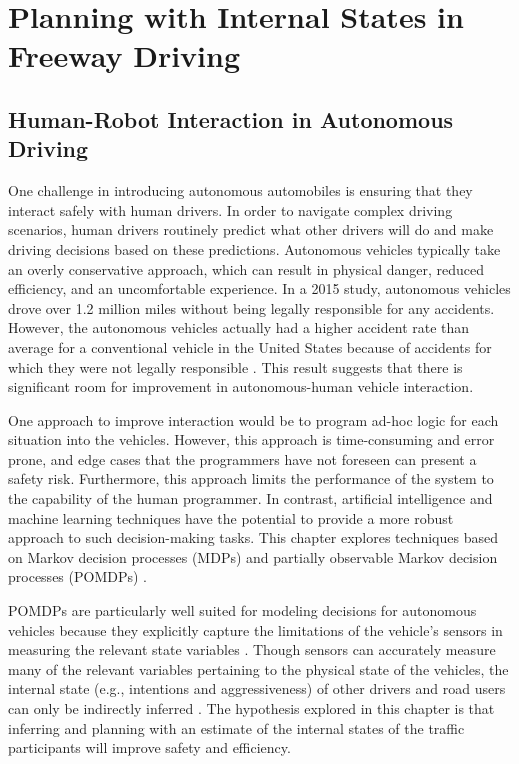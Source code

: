 \chapter{Planning with Internal States in Freeway Driving}

\section{Human-Robot Interaction in Autonomous Driving}

One challenge in introducing autonomous automobiles is ensuring that they interact safely with human drivers.
In order to navigate complex driving scenarios, human drivers routinely predict what other drivers will do and make driving decisions based on these predictions.
Autonomous vehicles typically take an overly conservative approach, which can result in physical danger, reduced efficiency, and an uncomfortable experience. %
In a 2015 study, autonomous vehicles drove over 1.2 million miles without being legally responsible for any accidents.
However, the autonomous vehicles actually had a higher accident rate than average for a conventional vehicle in the United States because of accidents for which they were not legally responsible \cite{schoettle2015crashes}.
This result suggests that there is significant room for improvement in autonomous-human vehicle interaction.  

One approach to improve interaction would be to program ad-hoc logic for each situation into the vehicles.
However, this approach is time-consuming and error prone, and edge cases that the programmers have not foreseen can present a safety risk.
Furthermore, this approach limits the performance of the system to the capability of the human programmer.
In contrast, artificial intelligence and machine learning techniques have the potential to provide a more robust approach to such decision-making tasks.
This chapter explores techniques based on Markov decision processes (MDPs) and partially observable Markov decision processes (POMDPs) \cite{Kochenderfer2015}.

POMDPs are particularly well suited for modeling decisions for autonomous vehicles because they explicitly capture the limitations of the vehicle's sensors in measuring the relevant state variables \cite{brechtel2013mcvi, sadigh2016gathering, bai2015intention}.
Though sensors can accurately measure many of the relevant variables pertaining to the physical state of the vehicles, the internal state (e.g., intentions and aggressiveness) of other drivers and road users can only be indirectly inferred \cite{sadigh2016gathering, bai2015intention, lam2015, dc2015}.
The hypothesis explored in this chapter is that inferring and planning with an estimate of the internal states of the traffic participants will improve safety and efficiency.

